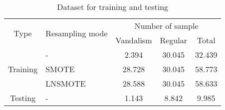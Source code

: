 \begin{table}[tp]
\caption{Dataset for training and testing}
\label{table:dataset}
\centering
\begin{tabular}{|| c | l | c | c | c ||}
\hline
\multirow{2}{*}{Type} & \multirow{2}{*}{Resampling mode}
	& \multicolumn{3}{c||}{Number of sample} \\
\cline{3-5}
    & & Vandalism & Regular & Total \\
\hline
\hline
\multirow{3}{*}{Training} & -       &  2.394 & 30.045 & 32.439 \\
                              & SMOTE   & 28.728 & 30.045 & 58.773 \\
                              & LNSMOTE & 28.588 & 30.045 & 58.633 \\
\hline
Testing & - & 1.143 & 8.842 & 9.985 \\
\hline
\end{tabular}
\end{table}
